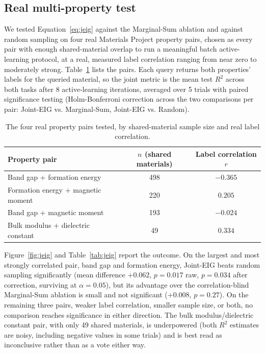 \documentclass[10pt]{article}
\begin{document}
\subsection{Real multi-property test}

We tested Equation~\ref{eq:jeig} against the Marginal-Sum ablation and against random sampling on four real Materials Project property pairs, chosen as every pair with enough shared-material overlap to run a meaningful batch active-learning protocol, at a real, measured label correlation ranging from near zero to moderately strong. Table~\ref{tab:pairs} lists the pairs. Each query returns both properties' labels for the queried material, so the joint metric is the mean test $R^2$ across both tasks after 8 active-learning iterations, averaged over 5 trials with paired significance testing (Holm-Bonferroni correction across the two comparisons per pair: Joint-EIG vs. Marginal-Sum, Joint-EIG vs. Random).

\begin{table}[htbp]
\centering
\small
\caption{The four real property pairs tested, by shared-material sample size and real label correlation.}
\label{tab:pairs}
\begin{tabular}{lcc}
\toprule
Property pair & $n$ (shared materials) & Label correlation $r$ \\
\midrule
Band gap + formation energy & 498 & $-0.365$ \\
Formation energy + magnetic moment & 220 & $0.205$ \\
Band gap + magnetic moment & 193 & $-0.024$ \\
Bulk modulus + dielectric constant & 49 & $0.334$ \\
\bottomrule
\end{tabular}
\end{table}

Figure~\ref{fig:jeig} and Table~\ref{tab:jeig} report the outcome. On the largest and most strongly correlated pair, band gap and formation energy, Joint-EIG beats random sampling significantly (mean difference $+0.062$, $p=0.017$ raw, $p=0.034$ after correction, surviving at $\alpha=0.05$), but its advantage over the correlation-blind Marginal-Sum ablation is small and not significant ($+0.008$, $p=0.27$). On the remaining three pairs, weaker label correlation, smaller sample size, or both, no comparison reaches significance in either direction. The bulk modulus/dielectric constant pair, with only 49 shared materials, is underpowered (both $R^2$ estimates are noisy, including negative values in some trials) and is best read as inconclusive rather than as a vote either way.
\end{document}
